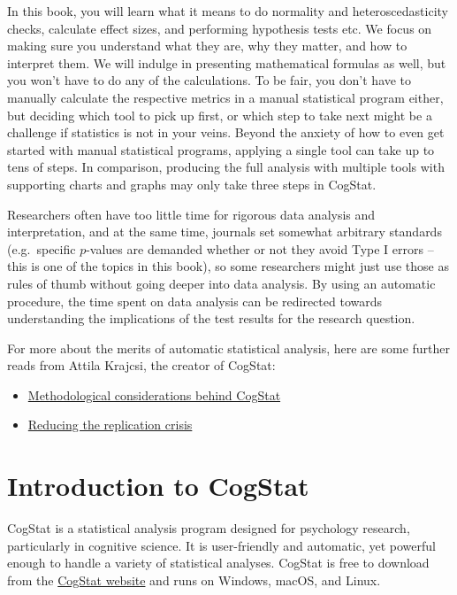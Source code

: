 \documentclass[
  11pt,
]{book}
\providecommand{\tightlist}{%
  \setlength{\itemsep}{0pt}\setlength{\parskip}{0pt}}
\theoremstyle{definition}
\theoremstyle{definition}
\theoremstyle{definition}
\theoremstyle{definition}
\theoremstyle{remark}
\begin{document}
In this book, you will learn what it means to do normality and heteroscedasticity checks, calculate effect sizes, and performing hypothesis tests etc. We focus on making sure you understand what they are, why they matter, and how to interpret them. We will indulge in presenting mathematical formulas as well, but you won't have to do any of the calculations. To be fair, you don't have to manually calculate the respective metrics in a manual statistical program either, but deciding which tool to pick up first, or which step to take next might be a challenge if statistics is not in your veins. Beyond the anxiety of how to even get started with manual statistical programs, applying a single tool can take up to tens of steps. In comparison, producing the full analysis with multiple tools with supporting charts and graphs may only take three steps in CogStat.

Researchers often have too little time for rigorous data analysis and interpretation, and at the same time, journals set somewhat arbitrary standards (e.g.~specific \(p\)-values are demanded whether or not they avoid Type I errors -- this is one of the topics in this book), so some researchers might just use those as rules of thumb without going deeper into data analysis. By using an automatic procedure, the time spent on data analysis can be redirected towards understanding the implications of the test results for the research question.

For more about the merits of automatic statistical analysis, here are some further reads from Attila Krajcsi, the creator of CogStat:

\begin{itemize}
\tightlist
\item
  \href{https://psyarxiv.com/hnmsq}{Methodological considerations behind CogStat}
\item
  \href{https://docs.google.com/presentation/d/1HmSTPnTxDzW8hYZG7ujHaeHc0mRqqYeY95yKh56z61c}{Reducing the replication crisis}
\end{itemize}

\hypertarget{cogstatintro}{%
\chapter{Introduction to CogStat}\label{cogstatintro}}

CogStat is a statistical analysis program designed for psychology research, particularly in cognitive science. It is user-friendly and automatic, yet powerful enough to handle a variety of statistical analyses. CogStat is free to download from the \href{http://cogstat.org}{CogStat website} and runs on Windows, macOS, and Linux.
\end{document}
